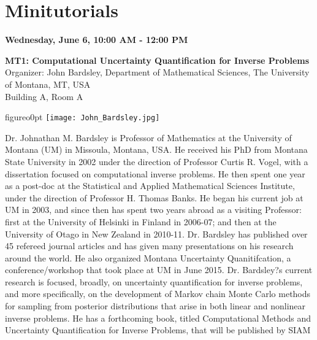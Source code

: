 \newpage
\section*{Minitutorials}


\begin{center}\textbf{Wednesday, June 6, 10:00 AM - 12:00 PM \\}\end{center}
\vspace{2cm}
\begin{center}
\textbf{MT1: Computational Uncertainty Quantification for Inverse Problems}\\
Organizer: John Bardsley, Department of Mathematical Sciences, The University of Montana, MT, USA\\
Building A, Room A
\end{center}
\vspace{2cm}

\begin{wrapfloat}{figure}{o}{0pt}
\texttt{[image: John\_Bardsley.jpg]}
\end{wrapfloat}
Dr. Johnathan M. Bardsley is Professor of Mathematics at the University of Montana (UM) in Missoula, Montana, USA. He received his PhD from Montana State University in 2002 under the direction of Professor Curtis R. Vogel, with a dissertation focused on computational inverse problems. He then spent one year as a post-doc at the Statistical and Applied Mathematical Sciences Institute, under the direction of Professor H. Thomas Banks. He began his current job at UM in 2003, and since then has spent two years abroad as a visiting Professor: first at the University of Helsinki in Finland in 2006-07; and then at the University of Otago in New Zealand in 2010-11. Dr. Bardsley has published over 45 refereed journal articles and has given many presentations on his research around the world. He also organized Montana Uncertainty Quanitifcation, a conference/workshop that took place at UM in June 2015. Dr. Bardsley?s current research is focused, broadly, on uncertainty quantification for inverse problems, and more specifically, on the development of Markov chain Monte Carlo methods for sampling from posterior distributions that arise in both linear and nonlinear inverse problems. He has a forthcoming book, titled Computational Methods and Uncertainty Quantification for Inverse Problems, that will be published by SIAM
\newpage

